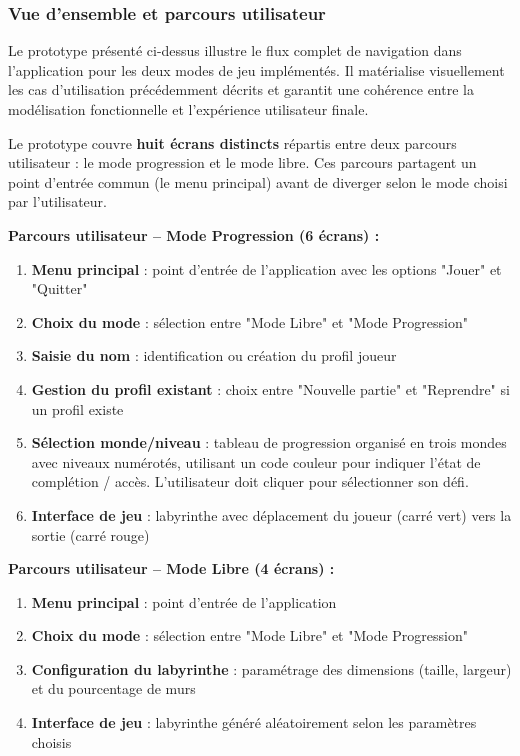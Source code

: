 \documentclass{butexFR}
\begin{document}
\subsubsection{Vue d'ensemble et parcours utilisateur}

Le prototype présenté ci-dessus illustre le flux complet de navigation dans l'application pour les deux modes de jeu implémentés. Il matérialise visuellement les cas d'utilisation précédemment décrits et garantit une cohérence entre la modélisation fonctionnelle et l'expérience utilisateur finale.

Le prototype couvre \textbf{huit écrans distincts} répartis entre deux parcours utilisateur : le mode progression et le mode libre. Ces parcours partagent un point d'entrée commun (le menu principal) avant de diverger selon le mode choisi par l'utilisateur.

\textbf{Parcours utilisateur -- Mode Progression (6 écrans) :}

\begin{enumerate}
    \item \textbf{Menu principal} : point d'entrée de l'application avec les options "Jouer" et "Quitter"
    \item \textbf{Choix du mode} : sélection entre "Mode Libre" et "Mode Progression"
    \item \textbf{Saisie du nom} : identification ou création du profil joueur
    \item \textbf{Gestion du profil existant} : choix entre "Nouvelle partie" et "Reprendre" si un profil existe
    \item \textbf{Sélection monde/niveau} : tableau de progression organisé en trois mondes avec niveaux numérotés, utilisant un code couleur pour indiquer l'état de complétion / accès. L'utilisateur doit cliquer pour sélectionner son défi.
    \item \textbf{Interface de jeu} : labyrinthe avec déplacement du joueur (carré vert) vers la sortie (carré rouge)
\end{enumerate}

\textbf{Parcours utilisateur -- Mode Libre (4 écrans) :}

\begin{enumerate}
    \item \textbf{Menu principal} : point d'entrée de l'application
    \item \textbf{Choix du mode} : sélection entre "Mode Libre" et "Mode Progression"
    \item \textbf{Configuration du labyrinthe} : paramétrage des dimensions (taille, largeur) et du pourcentage de murs
    \item \textbf{Interface de jeu} : labyrinthe généré aléatoirement selon les paramètres choisis
\end{enumerate}
\end{document}
